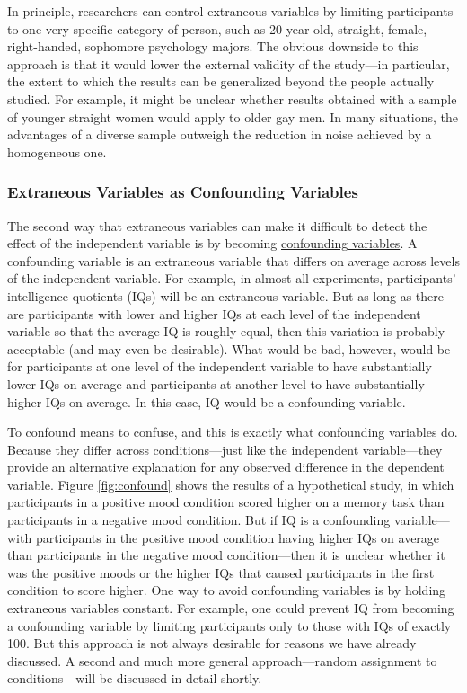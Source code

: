 \documentclass[
]{krantz}
\begin{document}
In principle, researchers can control extraneous variables by limiting participants to one very specific category of person, such as 20-year-old, straight, female, right-handed, sophomore psychology majors. The obvious downside to this approach is that it would lower the external validity of the study---in particular, the extent to which the results can be generalized beyond the people actually studied. For example, it might be unclear whether results obtained with a sample of younger straight women would apply to older gay men. In many situations, the advantages of a diverse sample outweigh the reduction in noise achieved by a homogeneous one.

\hypertarget{extraneous-variables-as-confounding-variables}{%
\subsubsection*{Extraneous Variables as Confounding Variables}\label{extraneous-variables-as-confounding-variables}}


The second way that extraneous variables can make it difficult to detect the effect of the independent variable is by becoming \protect\hyperlink{confounding-variable}{confounding variables}. A confounding variable is an extraneous variable that differs on average across levels of the independent variable. For example, in almost all experiments, participants' intelligence quotients (IQs) will be an extraneous variable. But as long as there are participants with lower and higher IQs at each level of the independent variable so that the average IQ is roughly equal, then this variation is probably acceptable (and may even be desirable). What would be bad, however, would be for participants at one level of the independent variable to have substantially lower IQs on average and participants at another level to have substantially higher IQs on average. In this case, IQ would be a confounding variable.

To confound means to confuse, and this is exactly what confounding variables do. Because they differ across conditions---just like the independent variable---they provide an alternative explanation for any observed difference in the dependent variable. Figure \ref{fig:confound} shows the results of a hypothetical study, in which participants in a positive mood condition scored higher on a memory task than participants in a negative mood condition. But if IQ is a confounding variable---with participants in the positive mood condition having higher IQs on average than participants in the negative mood condition---then it is unclear whether it was the positive moods or the higher IQs that caused participants in the first condition to score higher. One way to avoid confounding variables is by holding extraneous variables constant. For example, one could prevent IQ from becoming a confounding variable by limiting participants only to those with IQs of exactly 100. But this approach is not always desirable for reasons we have already discussed. A second and much more general approach---random assignment to conditions---will be discussed in detail shortly.
\end{document}
